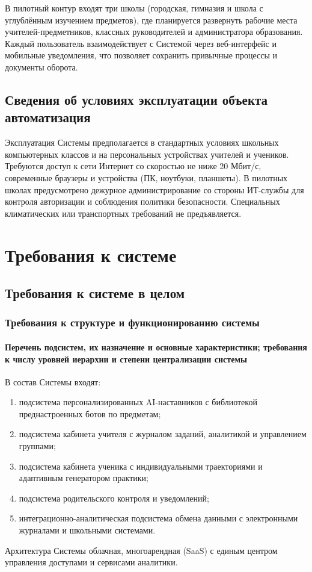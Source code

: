 \documentclass[14pt,a4paper]{extarticle}
\begin{document}
В пилотный контур входят три школы (городская, гимназия и школа с углублённым изучением предметов), где планируется развернуть рабочие места учителей-предметников, классных руководителей и администратора образования. Каждый пользователь взаимодействует с Системой через веб-интерфейс и мобильные уведомления, что позволяет сохранить привычные процессы и документы оборота.
\subsection{Сведения об условиях эксплуатации объекта автоматизация}
Эксплуатация Системы предполагается в стандартных условиях школьных компьютерных классов и на персональных устройствах учителей и учеников. Требуются доступ к сети Интернет со скоростью не ниже 20 Мбит/с, современные браузеры и устройства (ПК, ноутбуки, планшеты). В пилотных школах предусмотрено дежурное администрирование со стороны ИТ-службы для контроля авторизации и соблюдения политики безопасности. Специальных климатических или транспортных требований не предъявляется.

\section{Требования к системе}

\subsection{Требования к системе в целом}
\subsubsection{Требования к структуре и функционированию системы}
\paragraph{Перечень подсистем, их назначение и основные характеристики; требования к числу уровней иерархии и степени централизации системы} В состав Системы входят: \begin{enumerate}
  \item подсистема персонализированных AI-наставников с библиотекой преднастроенных ботов по предметам;
  \item подсистема кабинета учителя с журналом заданий, аналитикой и управлением группами;
  \item подсистема кабинета ученика с индивидуальными траекториями и адаптивным генератором практики;
  \item подсистема родительского контроля и уведомлений;
  \item интеграционно-аналитическая подсистема обмена данными с электронными журналами и школьными системами.
\end{enumerate}
Архитектура Системы облачная, многоарендная (SaaS) с единым центром управления доступами и сервисами аналитики.
\end{document}
